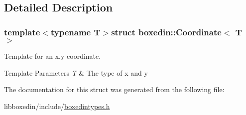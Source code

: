 \subsection{Detailed Description}
\subsubsection*{template$<$typename T$>$struct boxedin\+::\+Coordinate$<$ T $>$}

Template for an x,y coordinate. 


\begin{DoxyTemplParams}{Template Parameters}
{\em T} & The type of x and y \\
\hline
\end{DoxyTemplParams}


The documentation for this struct was generated from the following file\+:\begin{DoxyCompactItemize}
\item 
libboxedin/include/\hyperlink{boxedintypes_8h}{boxedintypes.\+h}\end{DoxyCompactItemize}
